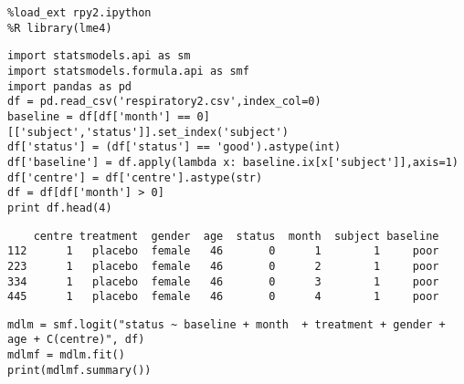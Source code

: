 \documentclass[12pt,fleqn]{article}\usepackage{../common}
\begin{document}
\begin{verbatim}
%load_ext rpy2.ipython
%R library(lme4)
\end{verbatim}

\begin{verbatim}
import statsmodels.api as sm
import statsmodels.formula.api as smf
import pandas as pd
df = pd.read_csv('respiratory2.csv',index_col=0)
baseline = df[df['month'] == 0][['subject','status']].set_index('subject')
df['status'] = (df['status'] == 'good').astype(int)
df['baseline'] = df.apply(lambda x: baseline.ix[x['subject']],axis=1)
df['centre'] = df['centre'].astype(str)
df = df[df['month'] > 0]
print df.head(4)
\end{verbatim}

\begin{verbatim}
    centre treatment  gender  age  status  month  subject baseline
112      1   placebo  female   46       0      1        1     poor
223      1   placebo  female   46       0      2        1     poor
334      1   placebo  female   46       0      3        1     poor
445      1   placebo  female   46       0      4        1     poor
\end{verbatim}


\begin{verbatim}
mdlm = smf.logit("status ~ baseline + month  + treatment + gender + age + C(centre)", df)
mdlmf = mdlm.fit()
print(mdlmf.summary())
\end{verbatim}
\end{document}

